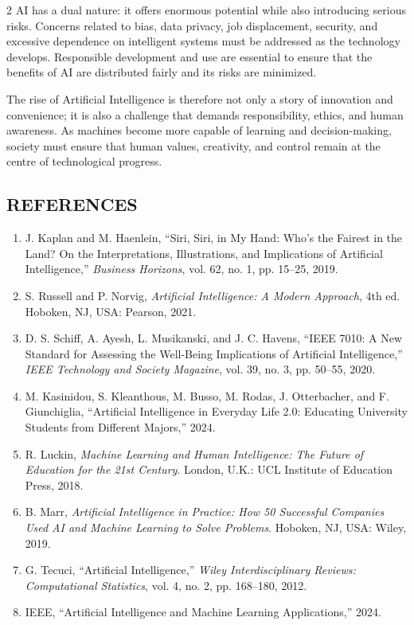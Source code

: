 \begin{multicols}{2}
  \noindent
  AI has a dual nature: it offers enormous potential while also introducing serious risks. Concerns related to bias, data privacy, job displacement, security, and excessive dependence on intelligent systems must be addressed as the technology develops. Responsible development and use are essential to ensure that the benefits of AI are distributed fairly and its risks are minimized.

  \noindent
  The rise of Artificial Intelligence is therefore not only a story of innovation and convenience; it is also a challenge that demands responsibility, ethics, and human awareness. As machines become more capable of learning and decision-making, society must ensure that human values, creativity, and control remain at the centre of technological progress.

  \subsection*{\centering\uppercase{References}}
  \begin{justify}
  \footnotesize
  \begin{enumerate}[leftmargin=*,itemsep=0pt]
    \item J. Kaplan and M. Haenlein, “Siri, Siri, in My Hand: Who's the Fairest in the Land? On the Interpretations, Illustrations, and Implications of Artificial Intelligence,” \textit{Business Horizons}, vol. 62, no. 1, pp. 15--25, 2019.
    \item S. Russell and P. Norvig, \textit{Artificial Intelligence: A Modern Approach}, 4th ed. Hoboken, NJ, USA: Pearson, 2021.
    \item D. S. Schiff, A. Ayesh, L. Musikanski, and J. C. Havens, “IEEE 7010: A New Standard for Assessing the Well-Being Implications of Artificial Intelligence,” \textit{IEEE Technology and Society Magazine}, vol. 39, no. 3, pp. 50--55, 2020.
    \item M. Kasinidou, S. Kleanthous, M. Busso, M. Rodas, J. Otterbacher, and F. Giunchiglia, “Artificial Intelligence in Everyday Life 2.0: Educating University Students from Different Majors,” 2024.
    \item R. Luckin, \textit{Machine Learning and Human Intelligence: The Future of Education for the 21st Century}. London, U.K.: UCL Institute of Education Press, 2018.
    \item B. Marr, \textit{Artificial Intelligence in Practice: How 50 Successful Companies Used AI and Machine Learning to Solve Problems}. Hoboken, NJ, USA: Wiley, 2019.
    \item G. Tecuci, “Artificial Intelligence,” \textit{Wiley Interdisciplinary Reviews: Computational Statistics}, vol. 4, no. 2, pp. 168--180, 2012.
    \item IEEE, “Artificial Intelligence and Machine Learning Applications,” 2024.
  \end{enumerate}
  \end{justify}
\end{multicols}
